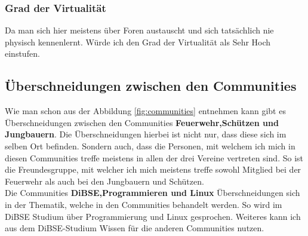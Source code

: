 \documentclass[12pt]{article}
\begin{document}
\subsubsection{Grad der Virtualität}
Da man sich hier meistens über Foren austauscht und sich tatsächlich nie physisch kennenlernt. Würde ich den Grad der Virtualität als Sehr Hoch einstufen.
\subsection{Überschneidungen zwischen den Communities}
Wie man schon aus der Abbildung \ref{fig:communities} entnehmen kann gibt es Überschneidungen zwischen den Communities \textbf{Feuerwehr,Schützen und Jungbauern}. Die Überschneidungen hierbei ist nicht nur, dass diese sich im selben Ort befinden. Sondern auch, dass die Personen, mit welchem ich mich in diesen Communities treffe meistens in allen der drei Vereine vertreten sind. So ist die Freundesgruppe, mit welcher ich mich meistens treffe sowohl Mitglied bei der Feuerwehr als auch bei den Jungbauern und Schützen.\\
Die Communities \textbf{DiBSE,Programmieren und Linux} Überschneidungen sich in der Thematik, welche in den Communities behandelt werden. So wird im DiBSE Studium über Programmierung und Linux gesprochen. Weiteres kann ich aus dem DiBSE-Studium Wissen für die anderen Communities nutzen.
\pagebreak
\end{document}
